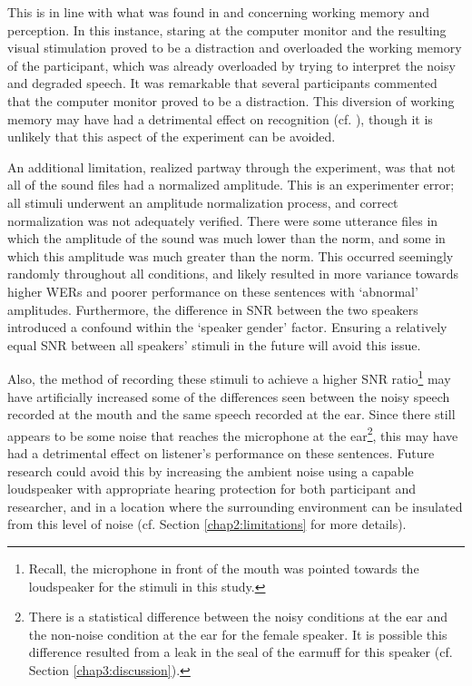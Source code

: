 This is in line with what was found in \cite{francis:09} and \cite{francis:10} concerning working memory and perception.  In this instance, staring at the computer monitor and the resulting visual stimulation proved to be a distraction and overloaded the working memory of the participant, which was already overloaded by trying to interpret the noisy and degraded speech.  It was remarkable that several participants commented that the computer monitor proved to be a distraction.  This diversion of working memory may have had a detrimental effect on recognition (cf. \cite{caplan:99}), though it is unlikely that this aspect of the experiment can be avoided.

An additional limitation, realized partway through the experiment, was that not all of the sound files had a normalized amplitude.  This is an experimenter error; all stimuli underwent an amplitude normalization process, and correct normalization was not adequately verified. There were some utterance files in which the amplitude of the sound was much lower than the norm, and some in which this amplitude was much greater than the norm.  This occurred seemingly randomly throughout all conditions, and likely resulted in more variance towards higher WERs and poorer performance on these sentences with `abnormal' amplitudes.  Furthermore, the difference in SNR between the two speakers introduced a confound within the `speaker gender' factor.  Ensuring a relatively equal SNR between all speakers' stimuli in the future will avoid this issue.

Also, the method of recording these stimuli to achieve a higher SNR ratio\footnote{Recall, the microphone in front of the mouth was pointed towards the loudspeaker for the stimuli in this study.} may have artificially increased some of the differences seen between the noisy speech recorded at the mouth and the same speech recorded at the ear.  Since there still appears to be some noise that reaches the microphone at the ear\footnote{There is a statistical difference between the noisy conditions at the ear and the non-noise condition at the ear for the female speaker. It is possible this difference resulted from a leak in the seal of the earmuff for this speaker (cf. Section \ref{chap3:discussion}).}, this may have had a detrimental effect on listener's performance on these sentences.  Future research could avoid this by increasing the ambient noise using a capable loudspeaker with appropriate hearing protection for both participant and researcher, and in a location where the surrounding environment can be insulated from this level of noise (cf. Section \ref{chap2:limitations} for more details).


